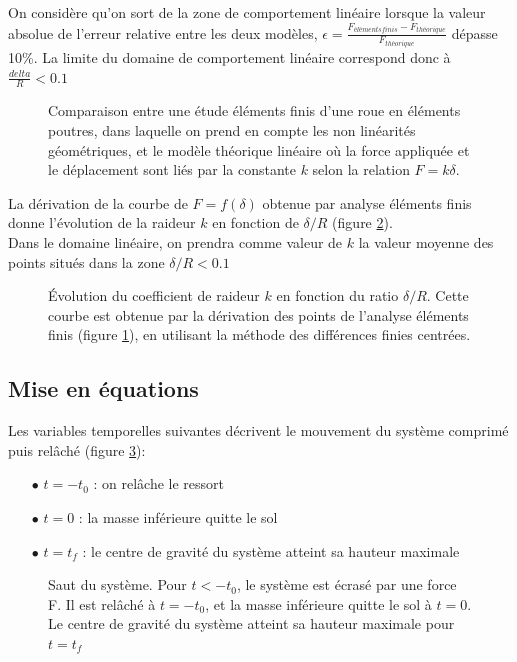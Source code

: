 On considère qu'on sort de la zone de comportement linéaire lorsque la valeur absolue de l'erreur relative entre les deux modèles, $\epsilon=\frac{F_{éléments finis}-F_{théorique}}{F_{théorique}}$ dépasse 10\%. La limite du domaine de comportement linéaire correspond donc à $\frac{delta}{R}<0.1$

\begin{figure}[h]
\centering

\caption{Comparaison entre une étude éléments finis d'une roue en éléments poutres, dans laquelle on prend en compte les non linéarités géométriques, et le modèle théorique linéaire où la force appliquée et le déplacement sont liés par la constante $k$ selon la relation $F=k \delta$.}
\label{fig:lin1}
\end{figure}

La dérivation de la courbe de $F=f(\delta)$ obtenue par analyse éléments finis donne l'évolution de la raideur $k$ en fonction de $\delta/R$ (figure \ref{fig:lin2}).\\
Dans le domaine linéaire, on prendra comme valeur de $k$ la valeur moyenne des points situés dans la zone $\delta/R<0.1$

\begin{figure}[h]
\centering

\caption{Évolution du coefficient de raideur $k$ en fonction du ratio $\delta/R$. Cette courbe est obtenue par la dérivation des points de l'analyse éléments finis (figure \ref{fig:lin1}), en utilisant la méthode des différences finies centrées.}
\label{fig:lin2}
\end{figure}

\subsection{Mise en équations}

Les variables temporelles suivantes décrivent le mouvement du système comprimé puis relâché  (figure \ref{fig:saut}):

\begin{itemize}
    \item[$\bullet$] $t=-t_0$ : on relâche le ressort
    \item[$\bullet$] $t=0$ : la masse inférieure quitte le sol
    \item[$\bullet$] $t=t_f$ : le centre de gravité du système atteint sa hauteur maximale
\end{itemize}



\begin{figure}[h]

\def\svgwidth{400}


\caption{Saut du système. Pour $t<-t_0$, le système est écrasé par une force F. Il est relâché à $t=-t_0$, et la masse inférieure quitte le sol à $t=0$. Le centre de gravité du système atteint sa hauteur maximale pour $t=t_f$}
\label{fig:saut}
\end{figure}

